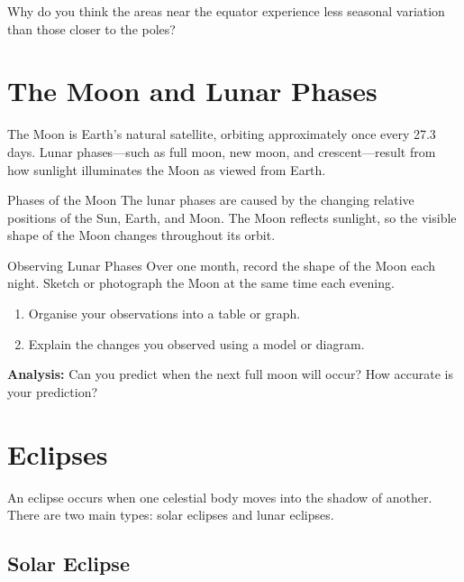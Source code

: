 \begin{stopandthink}
Why do you think the areas near the equator experience less seasonal variation than those closer to the poles?
\end{stopandthink}

\section{The Moon and Lunar Phases}

The Moon is Earth's natural satellite, orbiting approximately once every 27.3 days. Lunar phases—such as full moon, new moon, and crescent—result from how sunlight illuminates the Moon as viewed from Earth.


\begin{keyconcept}{Phases of the Moon}
The lunar phases are caused by the changing relative positions of the Sun, Earth, and Moon. The Moon reflects sunlight, so the visible shape of the Moon changes throughout its orbit.
\end{keyconcept}

\begin{investigation}{Observing Lunar Phases}
Over one month, record the shape of the Moon each night. Sketch or photograph the Moon at the same time each evening.
\begin{enumerate}
    \item Organise your observations into a table or graph.
    \item Explain the changes you observed using a model or diagram.
\end{enumerate}
\textbf{Analysis:} Can you predict when the next full moon will occur? How accurate is your prediction?
\end{investigation}

\section{Eclipses}

An eclipse occurs when one celestial body moves into the shadow of another. There are two main types: solar eclipses and lunar eclipses.

\subsection{Solar Eclipse}

